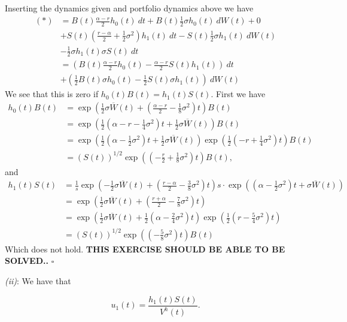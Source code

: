 \documentclass[a4paper,12pt,openany]{book}
\begin{document}
Inserting the dynamics given and portfolio dynamics above we have
\begin{align*}
(*)&=B(t)\frac{\alpha - r}{2}h_0(t)\ dt+B(t)\frac{1}{2}\sigma h_0(t)\ dW(t)+0\\
&+S(t)\left(\frac{r-\alpha}{2}+\frac{1}{2}\sigma^2\right)h_1(t)\ dt-S(t)\frac{1}{2}\sigma h_1(t)\ dW(t)\\
&-\frac{1}{2}\sigma h_1(t)\sigma S(t) \ dt\\
&=\left(B(t)\frac{\alpha - r}{2}h_0(t)-\frac{\alpha-r}{2}S(t)h_1(t)\right)\ dt\\
&+\left(\frac{1}{2}B(t)\sigma h_0(t)-\frac{1}{2}S(t)\sigma h_1(t)\right)\ dW(t)
\end{align*}
We see that this is zero if \(h_0(t)B(t)=h_1(t)S(t)\). First we have
\begin{align*}
h_0(t)B(t)&=\exp\left(\frac{1}{2}\sigma\overline{W}(t)+\left(\frac{\alpha - r}{2}-\frac{1}{8}\sigma^2\right)t\right)B(t)\\
&=\exp\left(\frac{1}{2}\left(\alpha - r-\frac{1}{4}\sigma^2\right)t+\frac{1}{2}\sigma\overline{W}(t)\right)B(t)\\
&=\exp\left(\frac{1}{2}\left(\alpha-\frac{1}{2}\sigma^2\right)t+\frac{1}{2}\sigma\overline{W}(t)\right)\exp\left(\frac{1}{2}\left( - r+\frac{1}{4}\sigma^2\right)t\right)B(t)\\
&=(S(t))^{1/2}\exp\left(\left(-\frac{r}{2}+\frac{1}{8}\sigma^2\right)t\right)B(t),
\end{align*}
and
\begin{align*}
h_1(t)S(t)&=\frac{1}{s}\exp\left(-\frac{1}{2}\sigma\overline{W}(t)+\left(\frac{r-\alpha}{2}-\frac{3}{8}\sigma^2\right)t\right)s\cdot\exp\left(\left(\alpha-\frac{1}{2}\sigma^2\right)t+\sigma\overline{W}(t)\right)\\
&=\exp\left(\frac{1}{2}\sigma\overline{W}(t)+\left(\frac{r+\alpha}{2}-\frac{7}{8}\sigma^2\right)t\right)\\
&=\exp\left(\frac{1}{2}\sigma\overline{W}(t)+\frac{1}{2}\left(\alpha-\frac{2}{4}\sigma^2\right)t\right)\exp\left(\frac{1}{2}\left(r-\frac{5}{4}\sigma^2\right)t\right)\\
&=(S(t))^{1/2}\exp\left(\left(-\frac{5}{8}\sigma^2\right)t\right)B(t)
\end{align*}
Which does not hold. \textbf{THIS EXERCISE SHOULD BE ABLE TO BE SOLVED..} \(\square\)

\emph{(ii)}: We have that

\[
u_1(t)=\frac{h_1(t)S(t)}{V^h(t)}.
\]
\end{document}

